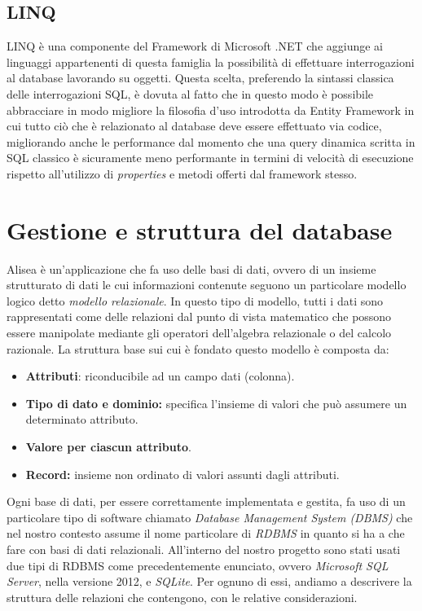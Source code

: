 \documentclass[a4]{book}
\begin{document}
\subsection{LINQ}
LINQ è una componente del Framework di Microsoft .NET che aggiunge ai linguaggi appartenenti di questa famiglia la possibilità di effettuare interrogazioni al database lavorando su oggetti. Questa scelta, preferendo la sintassi classica delle interrogazioni SQL, è dovuta al fatto che in questo modo è possibile abbracciare in modo migliore la filosofia d'uso introdotta da Entity Framework in cui tutto ciò che è relazionato al database deve essere effettuato via codice, migliorando anche le performance dal momento che una query dinamica scritta in SQL classico è sicuramente meno performante in termini di velocità di esecuzione rispetto all'utilizzo di \textit{properties} e metodi offerti dal framework stesso.

\section{Gestione e struttura del database}
Alisea è un'applicazione che fa uso delle basi di dati, ovvero di un insieme strutturato di dati le cui informazioni contenute seguono un particolare modello logico detto \textit{modello relazionale}. In questo tipo di modello, tutti i dati sono rappresentati come delle relazioni dal punto di vista matematico che possono essere manipolate mediante gli operatori dell'algebra relazionale o del calcolo razionale. La struttura base sui cui è fondato questo modello è composta da:
\begin{itemize}
	\item \textbf{Attributi}: riconducibile ad un campo dati (colonna).
	\item \textbf{Tipo di dato e dominio:} specifica l'insieme di valori che può assumere un determinato attributo.
	\item \textbf{Valore per ciascun attributo}.
	\item \textbf{Record:} insieme non ordinato di valori assunti dagli attributi.
\end{itemize}

Ogni base di dati, per essere correttamente implementata e gestita, fa uso di un particolare tipo di software chiamato \textit{Database Management System (DBMS)} che nel nostro contesto assume il nome particolare di \textit{RDBMS} in quanto si ha a che fare con basi di dati relazionali. All'interno del nostro progetto sono stati usati due tipi di RDBMS come precedentemente enunciato, ovvero \textit{Microsoft SQL Server}, nella versione 2012, e \textit{SQLite}. Per ognuno di essi, andiamo a descrivere la struttura delle relazioni che contengono, con le relative considerazioni.
\end{document}
